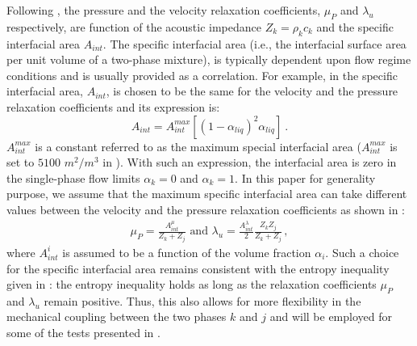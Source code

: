 \documentclass[preprint,10pt]{elsarticle}
\begin{document}
Following \cite{Berry_NED2010}, the pressure and the velocity relaxation coefficients, $\mu_P$  and $\lambda_u$ respectively, are function of the acoustic 
impedance $Z_k = \rho_k c_k$ and the specific interfacial area $A_{int}$. The specific interfacial area (i.e., the interfacial surface area per unit
volume of a two-phase mixture), is typically dependent upon flow regime conditions and is usually provided as a correlation. For example,
in \cite{Berry_NED2010} the specific interfacial area, $A_{int}$, is chosen to be the same for the velocity and the pressure relaxation coefficients and its
expression is:
%
\begin{equation}\label{eq:Aint-def}
A_{int} = A_{int}^{max} \left[ \left(1-\alpha_{liq} \right)^2 \alpha_{liq} \right] \ .
\end{equation}
% 
$A_{int}^{max}$ is a constant referred to as the maximum special interfacial area ($A_{int}^{max}$ is set to $5100$ $m^2 / m^3$ in \cite{Berry_NED2010}). 
With such an expression, the interfacial area is zero in the single-phase flow limits $\alpha_{k} = 0$ and $\alpha_{k} = 1$.
In this paper for generality purpose, we assume that the maximum specific interfacial area can take different values between the velocity and the pressure relaxation 
coefficients as shown in :
%
\begin{subequations}
\label{eq:relaxation_coeff}
\begin{align}
  \label{E-R:86}
  \mu_P = \frac{A_{int}^\mu}{Z_{k}+Z_{j}} 
  \text{ and }
  \lambda_u = \frac{A_{int}^\lambda}{2}  \frac{Z_{k} Z_{j}}{Z_{k}+Z_{j}} \, ,
\end{align}
\end{subequations}
%
where $A_{int}^i$ is assumed to be a function of the volume fraction $\alpha_i$. 
%
%
Such a choice for the specific interfacial area remains consistent with the entropy inequality given in : the entropy inequality holds 
as long as the relaxation coefficients $\mu_P$ and $\lambda_u$ remain positive. Thus, this also allows for more 
flexibility in the mechanical coupling between the two phases $k$ and $j$ and will be employed for some of the tests presented in .
\end{document}
